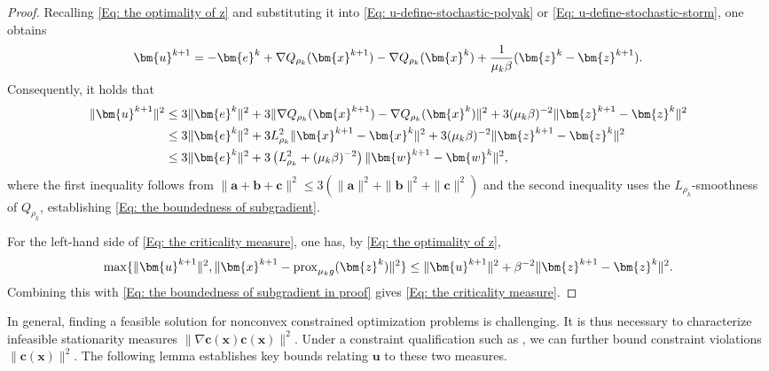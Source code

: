 \documentclass{article}
\theoremstyle{plain}
\theoremstyle{definition}
\theoremstyle{remark}
\newcommand{\prox}{\mathrm{prox}}
\newcommand{\bx}{\bm{x}}
\newcommand{\bb}{\bm{b}}
\newcommand{\bc}{\bm{c}}
\newcommand{\be}{\bm{e}}
\newcommand{\bu}{\bm{u}}
\newcommand{\bz}{\bm{z}}
\newcommand{\ba}{\bm{a}}
\newcommand{\bw}{\bm{w}}
\numberwithin{equation}{section}
\begin{document}
\begin{proof}
Recalling \eqref{Eq: the optimality of z} and substituting it into \eqref{Eq: u-define-stochastic-polyak} or \eqref{Eq: u-define-stochastic-storm}, one obtains
   \begin{align}
           \bu^{k+1}= - \be^{k}+ \nabla Q_{\rho_{k}}(\bx^{k+1}) -\nabla Q_{\rho_{k}}(\bx^{k}) + \frac{1}{\mu_{k}\beta}(\bz^{k}- \bz^{k+1}). \notag
    \end{align}
Consequently, it holds that
    \begin{align}
        \| \bu^{k+1}\|^{2} & \leq 3\| \be^{k}\|^{2}+ 3 \| \nabla Q_{\rho_{k}}(\bx^{k+1}) -\nabla Q_{\rho_{k}}(\bx^{k})\|^{2}+ 3(\mu_{k}\beta)^{-2}\| \bz^{k+1}- \bz^{k}\|^{2}\notag    \\
                           & \leq 3\| \be^{k}\|^{2}+ 3L_{\rho_k}^{2}\| \bx^{k+1}- \bx^{k}\|^{2}+ 3(\mu_{k}\beta)^{-2}\| \bz^{k+1}- \bz^{k}\|^{2}\notag                                 \\
                           & \leq 3\| \be^{k}\|^{2}+ 3\left(L_{\rho_k}^{2}+ (\mu_{k}\beta)^{-2}\right)\| \bw^{k+1}- \bw^{k}\|^{2},
                           \label{Eq: the boundedness of subgradient in proof}
    \end{align}
where the first inequality follows from
    $\| \ba + \bb + \bc \|^{2}\leq 3(\| \ba \|^{2}+ \| \bb \|^{2}+ \| \bc \|^{2})$ and the second inequality uses the $L_{\rho_k}$-smoothness of $Q_{\rho_k}$, establishing \eqref{Eq: the boundedness of subgradient}.

    For the left-hand side of \eqref{Eq: the criticality measure}, one has, by \eqref{Eq: the optimality of z},
    \begin{align}
        \max\{\|\bu^{k+1}\|^{2}, \|\bx^{k+1}- \prox_{\mu_k g}(\bz^{k})\|^{2}\} \leq \|\bu^{k+1}\|^{2}+ \beta^{-2}\|\bz^{k+1}- \bz^{k}\|^{2}. \notag
    \end{align}
Combining this with \eqref{Eq: the boundedness of subgradient in proof} gives \eqref{Eq: the criticality measure}.
\end{proof}
In general, finding a feasible solution for nonconvex constrained optimization problems is challenging. It is thus necessary to characterize infeasible stationarity measures \(\| \nabla \bc(\bx)\bc(\bx)\|^2\). Under a constraint qualification such as , we can further bound constraint violations \(\| \bc(\bx) \|^{2}\). The following lemma establishes key bounds relating \(\bu\) to these two measures.
\end{document}
